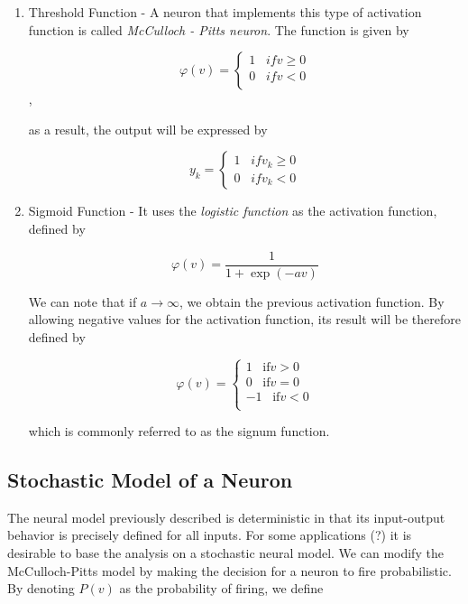 \documentclass[twocolumn]{article}
\begin{document}
	 \begin{enumerate}
		 \item Threshold Function - A neuron that implements this type of activation function is called \textit{McCulloch - Pitts neuron}. The function is given by

		       $$ \varphi (v) =
			       \begin{cases}
				       1 \;\;\; if v \geq 0 \\
				       0 \;\;\; if v < 0    \\
			       \end{cases}
		       $$,

		       \noindent as a result, the output will be expressed by

		       $$ y_k =
			       \begin{cases}
				       1 \;\;\; if v_{k} \geq 0 \\
				       0 \;\;\; if v_{k} < 0
			       \end{cases}
		       $$

		 \item Sigmoid Function - It uses the \textit{logistic function} as the activation function, defined by

		       $$ \varphi (v) = \dfrac{1}{1 + \exp (-av)} $$

		       We can note that if $ a \rightarrow \infty $, we obtain the previous activation function. By allowing negative values for the activation function, its result will be therefore defined by

		       $$ \varphi (v) =
			       \begin{cases}
				       1 \;\;\; \text{if} v > 0  \\
				       0 \;\;\; \text{if} v = 0  \\
				       -1 \;\;\; \text{if} v < 0 \\
			       \end{cases}
		       $$

		       \noindent which is commonly referred to as the signum function.
	 \end{enumerate}

 \subsection{Stochastic Model of a Neuron}
	 The neural model previously described is deterministic in that its input-output behavior is precisely defined for all inputs. For some applications (?) it is desirable to base the analysis on a stochastic neural model. We can modify the McCulloch-Pitts model by making the decision for a neuron to fire probabilistic. By denoting $ P (v) $ as the probability of firing, we define
\end{document}
